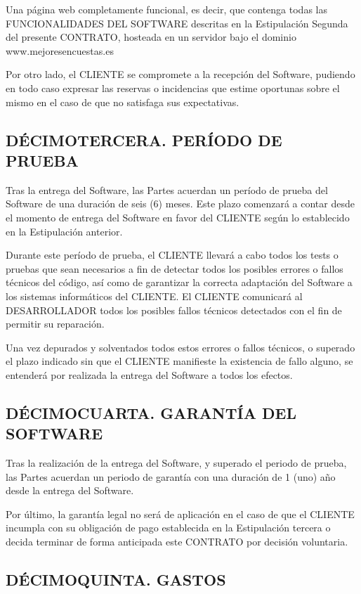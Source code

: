 \documentclass[a4paper,11pt]{report}
\begin{document}
	Una página web completamente funcional, es decir, que contenga todas las
	FUNCIONALIDADES DEL SOFTWARE descritas en la Estipulación Segunda del presente
	CONTRATO, hosteada en un servidor bajo el dominio www.mejoresencuestas.es

	Por otro lado, el CLIENTE se compromete a la recepción del Software,
	pudiendo en todo caso expresar las reservas o incidencias que estime
	oportunas sobre el mismo en el caso de que no satisfaga sus
	expectativas.

	\subsection*{DÉCIMOTERCERA. PERÍODO DE PRUEBA}

	Tras la entrega del Software, las Partes acuerdan un período de prueba
	del Software de una duración de seis (6) meses. Este plazo comenzará a contar
	desde el momento de entrega del Software en favor del CLIENTE según lo
	establecido en la Estipulación anterior.

	Durante este período de prueba, el CLIENTE llevará a cabo todos los
	tests o pruebas que sean necesarios a fin de detectar todos los posibles
	errores o fallos técnicos del código, así como de garantizar la correcta
	adaptación del Software a los sistemas informáticos del CLIENTE. El
	CLIENTE comunicará al DESARROLLADOR todos los posibles fallos técnicos
	detectados con el fin de permitir su reparación.

	Una vez depurados y solventados todos estos errores o fallos técnicos, o
	superado el plazo indicado sin que el CLIENTE manifieste la existencia
	de fallo alguno, se entenderá por realizada la entrega del Software a
	todos los efectos.

	\subsection*{DÉCIMOCUARTA. GARANTÍA DEL SOFTWARE}

	Tras la realización de la entrega del Software, y superado el periodo de
	prueba, las Partes acuerdan un periodo de garantía con una duración
	de 1 (uno) año desde la entrega del Software.

	Por último, la garantía legal no será de aplicación en el caso de que el
	CLIENTE incumpla con su obligación de pago establecida en la
	Estipulación tercera o decida terminar de forma anticipada este CONTRATO
	por decisión voluntaria.

	\subsection*{DÉCIMOQUINTA. GASTOS}
\end{document}
